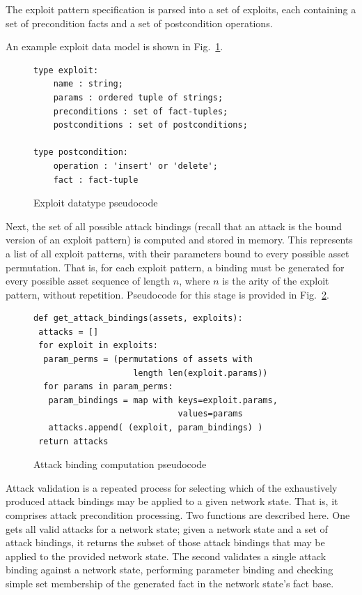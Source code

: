 The exploit pattern specification is parsed into a set of exploits, each
containing a set of precondition facts and a set of postcondition operations.

An example exploit data model is shown in
Fig.~\ref{fig:exploit_pc}.

\begin{figure}
\begin{lstlisting}
type exploit:
    name : string;
    params : ordered tuple of strings;
    preconditions : set of fact-tuples;
    postconditions : set of postconditions;
    
type postcondition:
    operation : 'insert' or 'delete';
    fact : fact-tuple
\end{lstlisting}
\label{fig:exploit_pc}
\caption{Exploit datatype pseudocode}
\end{figure}

Next, the set of all possible attack bindings (recall that an attack is the
bound version of an exploit pattern) is computed and stored in memory. This
represents a list of all exploit patterns, with their parameters bound to
every possible asset permutation. That is, for each exploit pattern, a
binding must be generated for every possible asset sequence of length $n$,
where $n$ is the arity of the exploit pattern, without repetition. Pseudocode
for this stage is provided in Fig.~\ref{fig:binding_computation_pc}.

\begin{figure}
\begin{lstlisting}
def get_attack_bindings(assets, exploits): 
 attacks = [] 
 for exploit in exploits:
  param_perms = (permutations of assets with 
                    length len(exploit.params))
  for params in param_perms:
   param_bindings = map with keys=exploit.params,
                             values=params
   attacks.append( (exploit, param_bindings) )
 return attacks
\end{lstlisting}
\label{fig:binding_computation_pc}
\caption{Attack binding computation pseudocode}
\end{figure}

Attack validation is a repeated process for selecting which of the exhaustively
produced attack bindings may be applied to a given network state. That is,
it comprises attack precondition processing. Two functions are described here.
One gets all valid attacks for a network state; given a network state
and a set of attack bindings, it returns the subset of those attack bindings
that may be applied to the provided network state. The second validates a
single attack binding against a network state, performing parameter binding and
checking simple set membership of the generated fact in the network state's
fact base.

